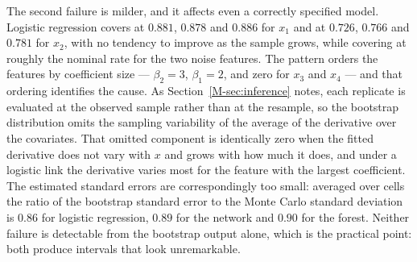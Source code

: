 \documentclass[12pt,a4paper]{article}
\numberwithin{equation}{section}
\theoremstyle{plain}
\theoremstyle{definition}
\begin{document}
	The second failure is milder, and it affects even a correctly specified model. Logistic regression covers at $0.881$, $0.878$ and $0.886$ for $x_1$ and at $0.726$, $0.766$ and $0.781$ for $x_2$, with no tendency to improve as the sample grows, while covering at roughly the nominal rate for the two noise features. The pattern orders the features by coefficient size --- $\beta_2 = 3$, $\beta_1 = 2$, and zero for $x_3$ and $x_4$ --- and that ordering identifies the cause. As Section~\ref{M-sec:inference} notes, each replicate is evaluated at the observed sample rather than at the resample, so the bootstrap distribution omits the sampling variability of the average of the derivative over the covariates. That omitted component is identically zero when the fitted derivative does not vary with $x$ and grows with how much it does, and under a logistic link the derivative varies most for the feature with the largest coefficient. The estimated standard errors are correspondingly too small: averaged over cells the ratio of the bootstrap standard error to the Monte Carlo standard deviation is $0.86$ for logistic regression, $0.89$ for the network and $0.90$ for the forest. Neither failure is detectable from the bootstrap output alone, which is the practical point: both produce intervals that look unremarkable.
	
\end{document}
